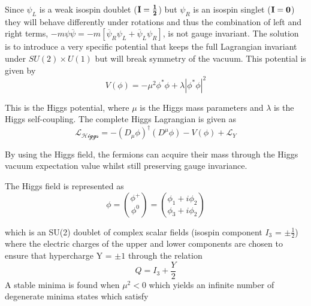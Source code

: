 


Since $\psi_{L}$ is a weak isospin doublet ($\bf{I}=\frac{1}{2}$) but $\psi_{R}$ is an isospin singlet ($\bf{I}=0$) they will behave differently under rotations and thus the combination of left and right terms, $-m\psi\overline{\psi} = -m[\overline{\psi}_{R}\psi_{L} + \overline{\psi}_{L}\psi_{R}]$, is not gauge invariant.
The solution is to introduce a very specific potential that keeps the full Lagrangian invariant under $SU(2)\times U(1)$ but will break symmetry of the vacuum.
This potential is given by
\begin{equation}
  V(\phi) = -\mu^{2}\phi^{*}\phi +\lambda|\phi^{*}\phi|^{2}
\end{equation}

This is the Higgs potential,  where $\mu$ is the Higgs mass parameters and $\lambda$ is the Higgs self-coupling. The complete Higgs Lagrangian is given as 
\begin{equation}
  \mathcal{L_{Higgs}} = -(D_{\mu}\phi)^{\dagger}(D^{\mu}\phi) - V(\phi) + \mathcal{L}_{Y}
\end{equation}

By using the Higgs field, the fermions can acquire their mass through the Higgs vacuum expectation value whilst still preserving gauge invariance.

The Higgs field is represented as 
\begin{equation}
  \phi = \binom{\phi^{+}}{\phi^{0}}  = \binom{\phi_{1} + i\phi_{2}}{\phi_{3} + i\phi_{2}}
  \label{eq:higgsspin_1}
\end{equation}

which is an SU(2) doublet of complex scalar fields (isospin component $I_{3}$ =  $\pm\frac{1}{2}$) where the electric charges of the upper and lower components are chosen to ensure that hypercharge Y  = $\pm 1$ through the relation 
\begin{equation}
  Q = I_{3}+\frac{Y}{2}
\end{equation}
A stable minima is found when $\mu^{2}<0$ which yields an infinite number of degenerate minima states which satisfy

